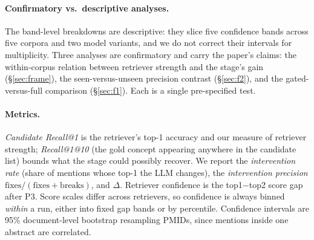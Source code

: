 \documentclass[11pt]{article}
\makeatletter
\newcommand{\rone}{Recall@1}
\makeatother
\begin{document}
\paragraph{Confirmatory vs.\ descriptive analyses.}
The band-level breakdowns are descriptive: they slice five confidence bands across five
corpora and two model variants, and we do not correct their intervals for
multiplicity. Three analyses are confirmatory and carry the paper's claims: the
within-corpus relation between retriever strength and the stage's gain
(\S\ref{sec:frame}), the seen-versus-unseen precision contrast (\S\ref{sec:f2}), and
the gated-versus-full comparison (\S\ref{sec:f1}). Each is a single pre-specified
test.

\paragraph{Metrics.}
\emph{Candidate \rone{}} is the retriever's top-1 accuracy and our measure of
retriever strength; \emph{\rone{}@10} (the gold concept appearing anywhere in the
candidate list) bounds what the stage could possibly recover. We report the
\emph{intervention rate} (share of mentions whose top-1 the LLM changes), the
\emph{intervention precision} $\mathrm{fixes}/(\mathrm{fixes}+\mathrm{breaks})$, and
$\Delta$. Retriever confidence is the top1$-$top2 score gap after P3. Score scales
differ across retrievers, so confidence is always binned \emph{within} a run, either
into fixed gap bands or by percentile. Confidence intervals are 95\% document-level
bootstrap \citep{efron-1979-bootstrap} resampling PMIDs, since mentions inside one
abstract are correlated.
\end{document}
